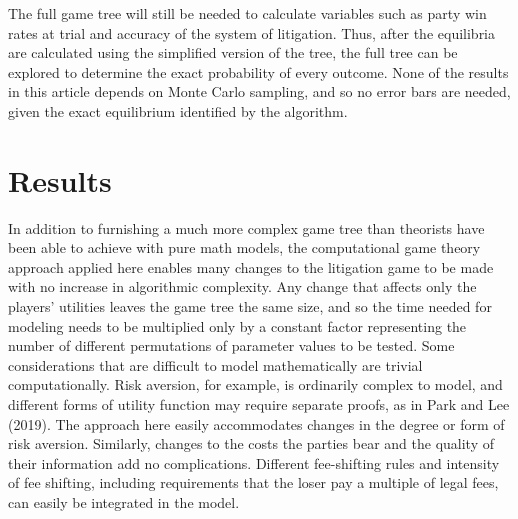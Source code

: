 \documentclass{article}
\begin{document}
The full game tree will still be needed to calculate variables such as party win rates at trial and accuracy of the system of litigation. Thus, after the equilibria are calculated using the simplified version of the tree, the full tree can be explored to determine the exact probability of every outcome. None of the results in this article depends on Monte Carlo sampling, and so no error bars are needed, given the exact equilibrium identified by the algorithm.

\section{Results} \label{results}

In addition to furnishing a much more complex game tree than theorists have been able to achieve with pure math models, the computational game theory approach applied here enables many changes to the litigation game to be made with no increase in algorithmic complexity. Any change that affects only the players' utilities leaves the game tree the same size, and so the time needed for modeling needs to be multiplied only by a constant factor representing the number of different permutations of parameter values to be tested. Some considerations that are difficult to model mathematically are trivial computationally. Risk aversion, for example, is ordinarily complex to model, and different forms of utility function may require separate proofs, as in Park and Lee (2019). The approach here easily accommodates changes in the degree or form of risk aversion. Similarly, changes to the costs the parties bear and the quality of their information add no complications. Different fee-shifting rules and intensity of fee shifting, including requirements that the loser pay a multiple of legal fees, can easily be integrated in the model. 
\end{document}
